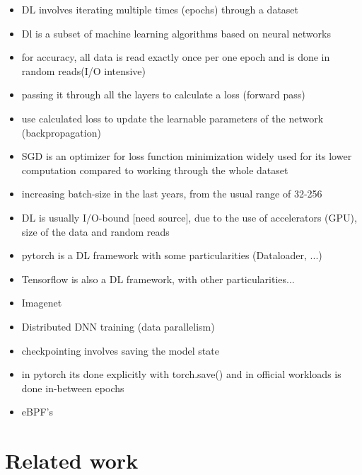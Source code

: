 \documentclass[conference]{IEEEtran}
\begin{document}
\begin{itemize}
    


    \item DL involves iterating multiple times (epochs) through a dataset
    \item Dl is a subset of machine learning algorithms based on neural networks
    \item for accuracy, all data is read exactly once per one epoch and is done in random reads(I/O intensive)
    \item passing it through all the layers to calculate a loss (forward pass)
    \item use calculated loss to update the learnable parameters of the network (backpropagation)
    \item SGD is an optimizer for loss function minimization widely used for its lower computation compared to working through the whole dataset 
    \item increasing batch-size in the last years, from the usual range of 32-256 \cite{nvme}
    \item DL is usually I/O-bound [need source], due to the use of accelerators (GPU), size of the data and random reads
    \item pytorch is a DL framework with some particularities (Dataloader, ...)
    \item Tensorflow is also a DL framework, with other particularities...
    \item Imagenet
    \item Distributed DNN training (data parallelism)
    \item checkpointing involves saving the model state
    \item in pytorch its done explicitly with torch.save() and in official workloads is done in-between epochs
    \item eBPF's
\end{itemize}

\section{Related work}
\end{document}
